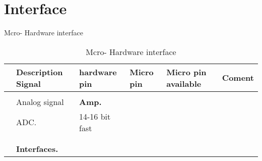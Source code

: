 

\chapter{Interface}


Mcro- Hardware interface
\label{Mcro- Hardware interface}

\begin{table}[H]
        \centering
        \begin{tabularx}{\linewidth}{|p{20pt}|X|X |X|X|X|}
                      \hline
                      
   &\textbf{Description Signal} &\textbf{hardware pin} &\textbf{Micro pin}&\textbf{Micro pin available}&\textbf{Coment} 
        \\\hline
   		 &	&  &  & &	  \\ 
       &  Analog signal &\textbf{Amp.} & & &
        
        \\\hline    
  
    
    &ADC.	&14-16 bit fast	&	   
        
		\\\hline    
      
                   &	&	&	   
        
		\\\hline     
                  

   		 &	&  &	  \\ 
       &\textbf{Interfaces.}  & &
        


\end{tabularx}
\caption{Mcro- Hardware interface}
\label{tab:Mcro- Hardware interface }
\end{table}
